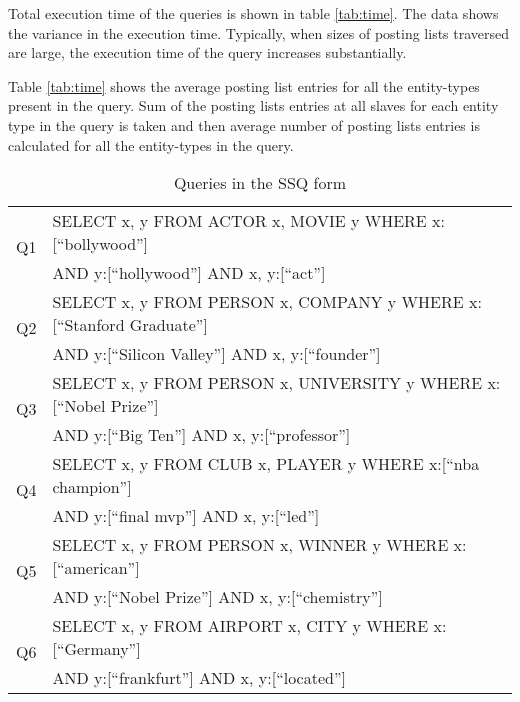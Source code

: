 \documentclass[11pt]{report}
\begin{document}
Total execution time of the queries is shown in table \ref{tab:time}. The data shows the variance in the execution time.
Typically, when sizes of posting lists traversed are large, the execution time of the query increases substantially.

Table \ref{tab:time} shows the average posting list entries for all the entity-types present in the query. Sum of the posting lists entries at all slaves
for each entity type in the query is taken and then average number of posting lists entries is calculated for all the entity-types in the query.

\begin{table}[htbp]
 \begin{center}
 \caption{Queries in the SSQ form}
 \label{tab:ssq}
\begin{tabular}{|l|l|}
\hline
\multirow{2}{*}{Q1} & SELECT x, y FROM ACTOR x, MOVIE y WHERE x:[``bollywood'']   \\
 & AND y:[``hollywood''] AND x, y:[``act''] \\
\hline
\multirow{2}{*}{Q2} & SELECT x, y FROM PERSON x, COMPANY y WHERE x:[``Stanford Graduate'']   \\
 & AND y:[``Silicon Valley''] AND x, y:[``founder''] \\
\hline
\multirow{2}{*}{Q3} & SELECT x, y FROM PERSON x, UNIVERSITY y WHERE x:[``Nobel Prize'']   \\
 & AND y:[``Big Ten''] AND x, y:[``professor''] \\
\hline
\multirow{2}{*}{Q4} & SELECT x, y FROM CLUB x, PLAYER y WHERE x:[``nba champion'']   \\
 & AND y:[``final mvp''] AND x, y:[``led''] \\
\hline
\multirow{2}{*}{Q5} & SELECT x, y FROM PERSON x, WINNER y WHERE x:[``american'']   \\
 & AND y:[``Nobel Prize''] AND x, y:[``chemistry''] \\
\hline
\multirow{2}{*}{Q6} & SELECT x, y FROM AIRPORT x, CITY y WHERE x:[``Germany'']   \\
 & AND y:[``frankfurt''] AND x, y:[``located''] \\
\hline
\end{tabular}
\end{center}
\end{table}
\end{document}
